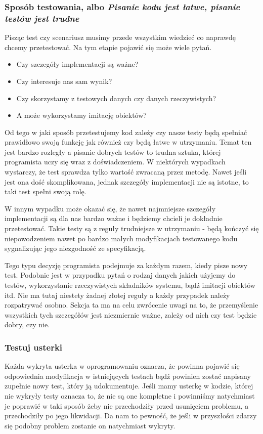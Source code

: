   \subsubsection{Sposób testowania, albo \emph{Pisanie kodu jest łatwe, pisanie testów jest trudne}}
  Pisząc test czy scenariusz musimy przede wszystkim wiedzieć co naprawdę chcemy przetestować. Na tym etapie pojawić się może wiele pytań.
  \begin{itemize}
    \item Czy szczegóły implementacji są ważne? 
    \item Czy interesuje nas sam wynik? 
    \item Czy skorzystamy z testowych danych czy danych rzeczywistych? 
    \item A może wykorzystamy imitację obiektów?
  \end{itemize}
  
  Od tego w jaki sposób przetestujemy kod zależy czy nasze testy będą spełniać prawidłowo swoją funkcję jak również czy będą łatwe w utrzymaniu. Temat ten jest bardzo rozległy a pisanie dobrych testów to trudna sztuka, której programista uczy się wraz z doświadczeniem. W niektórych wypadkach wystarczy, że test sprawdza tylko wartość zwracaną przez metodę. Nawet jeśli jest ona dość skomplikowana, jednak szczegóły implementacji nie są istotne, to taki test spełni swoją rolę. 
  
  W innym wypadku może okazać się, że nawet najmniejsze szczegóły implementacji są dla nas bardzo ważne i będziemy chcieli je dokładnie przetestować. Takie testy są z reguły trudniejsze w utrzymaniu - będą kończyć się niepowodzeniem nawet po bardzo małych modyfikacjach testowanego kodu sygnalizując jego niezgodność ze specyfikacją.
  
  Tego typu decyzję programista podejmuje za każdym razem, kiedy pisze nowy test. Podobnie jest w przypadku pytań o rodzaj danych jakich użyjemy do testów, wykorzystanie rzeczywistych składników systemu, bądź imitacji obiektów itd. Nie ma tutaj niestety żadnej złotej reguły a każdy przypadek należy rozpatrywać osobno. Sekcja ta ma na celu zwrócenie uwagi na to, że przemyślenie wszystkich tych szczegółów jest niezmiernie ważne, zależy od nich czy test będzie dobry, czy nie.
  
  \subsubsection{Testuj usterki}
  Każda wykryta usterka w oprogramowaniu oznacza, że powinna pojawić się odpowiednia modyfikacja w istniejących testach bądź powinien zostać napisany zupełnie nowy test, który ją udokumentuje. Jeśli mamy usterkę w kodzie, której nie wykryły testy oznacza to, że nie są one kompletne i powinniśmy natychmiast je poprawić w taki sposób żeby nie przechodziły przed usunięciem problemu, a przechodziły po jego likwidacji. Da nam to pewność, że jeśli w przyszłości zdarzy się podobny problem zostanie on natychmiast wykryty.
  
